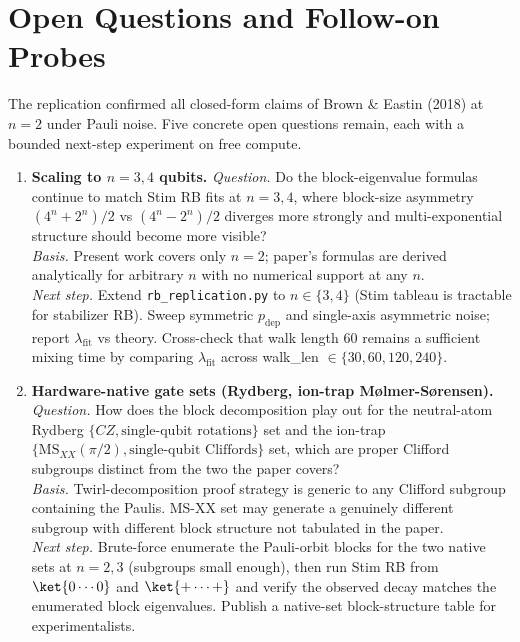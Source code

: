 \section{Open Questions and Follow-on Probes}

The replication confirmed all closed-form claims of Brown \& Eastin (2018)
at $n=2$ under Pauli noise. Five concrete open questions remain, each with
a bounded next-step experiment on free compute.

\begin{enumerate}

\item \textbf{Scaling to $n=3,4$ qubits.}
\emph{Question.} Do the block-eigenvalue formulas continue to match Stim RB
fits at $n=3,4$, where block-size asymmetry
$(4^n+2^n)/2$ vs $(4^n-2^n)/2$ diverges more strongly and multi-exponential
structure should become more visible?\\
\emph{Basis.} Present work covers only $n=2$; paper's formulas are derived
analytically for arbitrary $n$ with no numerical support at any $n$.\\
\emph{Next step.} Extend \texttt{rb\_replication.py} to $n \in \{3,4\}$
(Stim tableau is tractable for stabilizer RB). Sweep symmetric $p_{\mathrm{dep}}$
and single-axis asymmetric noise; report $\lambda_{\mathrm{fit}}$ vs
theory. Cross-check that walk length 60 remains a sufficient mixing time
by comparing $\lambda_{\mathrm{fit}}$ across walk\_len $\in \{30,60,120,240\}$.

\item \textbf{Hardware-native gate sets (Rydberg, ion-trap M{\o}lmer-S{\o}rensen).}
\emph{Question.} How does the block decomposition play out for the
neutral-atom Rydberg $\{CZ, \text{single-qubit rotations}\}$ set and the
ion-trap $\{\text{MS}_{XX}(\pi/2), \text{single-qubit Cliffords}\}$ set,
which are proper Clifford subgroups distinct from the two the paper covers?\\
\emph{Basis.} Twirl-decomposition proof strategy is generic to any Clifford
subgroup containing the Paulis. MS-XX set may generate a genuinely different
subgroup with different block structure not tabulated in the paper.\\
\emph{Next step.} Brute-force enumerate the Pauli-orbit blocks for the
two native sets at $n=2,3$ (subgroups small enough), then run Stim RB
from $\ket{0\cdots 0}$ and $\ket{+\cdots +}$ and verify the observed
decay matches the enumerated block eigenvalues. Publish a native-set
block-structure table for experimentalists.


\end{enumerate}
